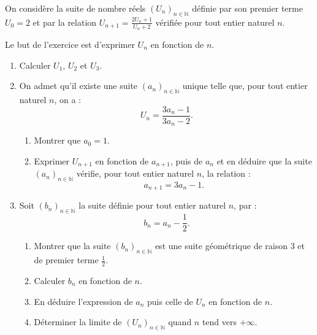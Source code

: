 \begin{exo}
      On consid\`ere la suite de nombre r\'eels $(U_n)_{n\in\mathbb{N}}$ d\'efinie par 
      son premier terme $U_0 = 2$ et par la relation $U_{n+1} = \frac{2 U_n + 1}{U_n + 2}$
      v\'erifi\'ee pour tout entier naturel $n$.
      
      Le but de l'exercice est d'exprimer $U_n$ en fonction de $n$.
      \begin{enumerate}
            \item Calculer $U_1$, $U_2$ et $U_3$.
            \item On admet qu'il existe une suite $(a_n)_{n\in\mathbb{N}}$ unique telle que,
                  pour tout entier naturel $n$, on a : 
                        \[
                              U_n = \frac{3a_n-1}{3a_n-2}.
                        \]
                  \begin{enumerate}
                        \item Montrer que $a_0 = 1$.
                        \item Exprimer $U_{n+1}$ en fonction de $a_{n+1}$, 
                              puis de $a_n$ et en d\'eduire que la suite $(a_n)_{n\in\mathbb{N}}$ v\'erifie,
                              pour tout entier naturel $n$, la relation : 
                                    \[
                                          a_{n+1} = 3 a_n - 1.
                                    \]
                  \end{enumerate}
            \item Soit $(b_n)_{n\in\mathbb{N}}$ la suite d\'efinie pour tout entier naturel $n$, par :
                        \[
                              b_n = a_n - \frac{1}{2}.
                        \]
                  \begin{enumerate}
                        \item Montrer que la suite $(b_n)_{n\in\mathbb{N}}$ est une suite g\'eom\'etrique de 
                              raison 3 et de premier terme $\frac{1}{2}$.
                        \item Calculer $b_n$ en fonction de $n$.
                        \item En d\'eduire l'expression de $a_n$ puis celle de $U_n$ en fonction de $n$.
                        \item D\'eterminer la limite de $(U_n)_{n\in\mathbb{N}}$ quand $n$ tend vers $+\infty$.
                  \end{enumerate}
      \end{enumerate}
\end{exo}
